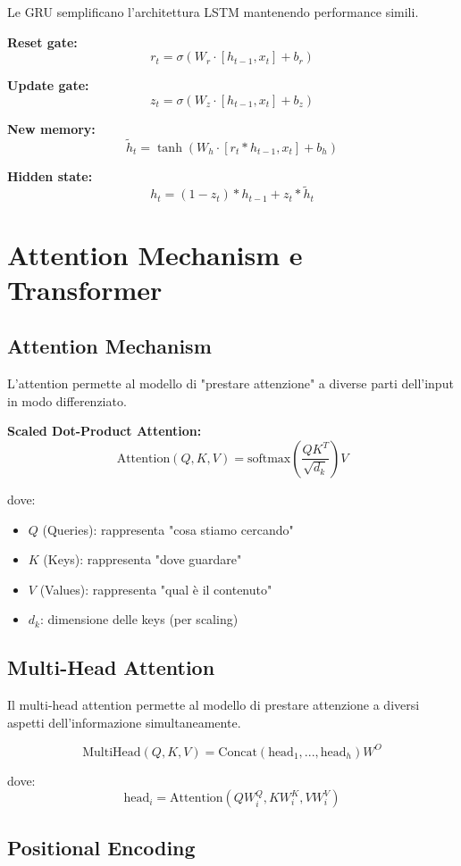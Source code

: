 \documentclass[12pt,a4paper,twoside]{report}
\begin{document}
Le GRU semplificano l'architettura LSTM mantenendo performance simili.

\textbf{Reset gate:}
$$r_t = \sigma(W_r \cdot [h_{t-1}, x_t] + b_r)$$

\textbf{Update gate:}
$$z_t = \sigma(W_z \cdot [h_{t-1}, x_t] + b_z)$$

\textbf{New memory:}
$$\tilde{h}_t = \tanh(W_h \cdot [r_t * h_{t-1}, x_t] + b_h)$$

\textbf{Hidden state:}
$$h_t = (1 - z_t) * h_{t-1} + z_t * \tilde{h}_t$$

\section{Attention Mechanism e Transformer}

\subsection{Attention Mechanism}

L'attention permette al modello di "prestare attenzione" a diverse parti dell'input in modo differenziato.

\textbf{Scaled Dot-Product Attention:}
$$\text{Attention}(Q, K, V) = \text{softmax}\left(\frac{QK^T}{\sqrt{d_k}}\right)V$$

dove:
\begin{itemize}
    \item $Q$ (Queries): rappresenta "cosa stiamo cercando"
    \item $K$ (Keys): rappresenta "dove guardare"
    \item $V$ (Values): rappresenta "qual è il contenuto"
    \item $d_k$: dimensione delle keys (per scaling)
\end{itemize}

\subsection{Multi-Head Attention}

Il multi-head attention permette al modello di prestare attenzione a diversi aspetti dell'informazione simultaneamente.

$$\text{MultiHead}(Q, K, V) = \text{Concat}(\text{head}_1, ..., \text{head}_h)W^O$$

dove:
$$\text{head}_i = \text{Attention}(QW_i^Q, KW_i^K, VW_i^V)$$

\subsection{Positional Encoding}
\end{document}
